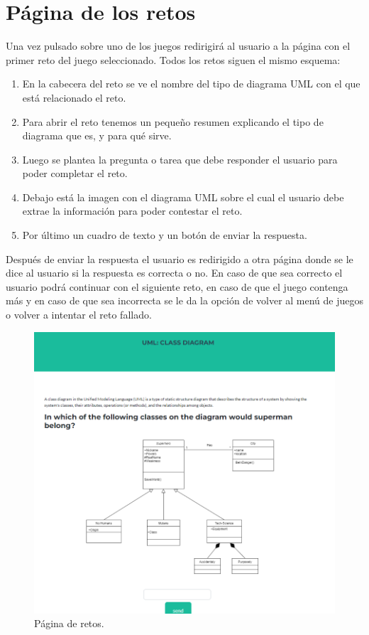 \documentclass[a4paper, 12pt]{book}
\begin{document}
\section{Página de los retos}
Una vez pulsado sobre uno de los juegos redirigirá al usuario a la página con el primer reto del juego seleccionado. Todos los retos siguen el mismo esquema: 
\begin{enumerate}
	\item En la cabecera del reto se ve el nombre del tipo de diagrama UML con el que está relacionado el reto.
	\item Para abrir el reto tenemos un pequeño resumen explicando el tipo de diagrama que es, y para qué sirve. 
	\item Luego se plantea la pregunta o tarea que debe responder el usuario para poder completar el reto. 
	\item Debajo está la imagen con el diagrama UML sobre el cual el usuario debe extrae la información para poder contestar el reto.
	\item Por último un cuadro de texto y un botón de enviar la respuesta. 
\end{enumerate}
Después de enviar la respuesta el usuario es redirigido a otra página donde se le dice al usuario si la respuesta es correcta o no. En caso de que sea correcto el usuario podrá continuar con el siguiente reto, en caso de que el juego contenga más y en caso de que sea incorrecta se le da la opción de volver al menú de juegos o volver a intentar el reto fallado. 
\begin{figure}
	\centering
	\includegraphics[width=16cm, keepaspectratio]{img/challenge_html.png}
	\caption{Página de retos.}\label{fig:challenge}
\end{figure}
\end{document}
